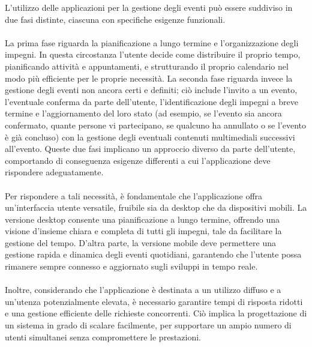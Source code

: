 L’utilizzo delle applicazioni per la gestione degli eventi può essere suddiviso in due fasi distinte, 
ciascuna con specifiche esigenze funzionali.\\
\\
La prima fase riguarda la pianificazione a lungo termine e l’organizzazione degli impegni.
In questa circostanza l’utente decide come distribuire il proprio tempo, pianificando attività e appuntamenti,
e strutturando il proprio calendario nel modo più efficiente per le proprie necessità.
La seconda fase riguarda invece la gestione degli eventi non ancora certi e definiti;
ciò include l’invito a un evento, l’eventuale conferma da parte dell’utente,
l’identificazione degli impegni a breve termine e l’aggiornamento del loro stato
(ad esempio, se l’evento sia ancora confermato, quante persone vi partecipano, se qualcuno ha annullato o se l'evento è già concluso)
con la gestione degli eventuali contenuti multimediali successivi all’evento. 
Queste due fasi implicano un approccio diverso da parte dell’utente,
comportando di conseguenza esigenze differenti a cui l’applicazione deve rispondere adeguatamente.\\
\\
Per rispondere a tali necessità, è fondamentale che l'applicazione offra un'interfaccia utente versatile, 
fruibile sia da desktop che da dispositivi mobili.
La versione desktop consente una pianificazione a lungo termine, offrendo una visione d'insieme chiara e completa di tutti gli impegni,
tale da facilitare la gestione del tempo.
D'altra parte, la versione mobile deve permettere una gestione rapida e dinamica degli eventi quotidiani,
garantendo che l'utente possa rimanere sempre connesso e aggiornato sugli sviluppi in tempo reale.\\
\\
Inoltre, considerando che l'applicazione è destinata a un utilizzo diffuso e a un'utenza potenzialmente elevata,
è necessario garantire tempi di risposta ridotti e una gestione efficiente delle richieste concorrenti.
Ciò implica la progettazione di un sistema in grado di scalare facilmente,
per supportare un ampio numero di utenti simultanei senza compromettere le prestazioni.\\
\\


